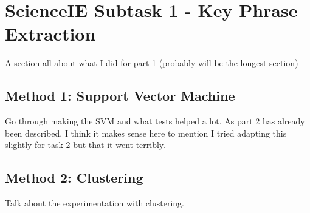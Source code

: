 \section{ScienceIE Subtask 1 - Key Phrase Extraction}
A section all about what I did for part 1 (probably will be the longest section)
\subsection{Method 1: Support Vector Machine}
Go through making the SVM and what tests helped a lot. 
As part 2 has already been described, I think it makes sense here to mention I tried adapting this slightly for task 2 but that it went terribly.
\subsection{Method 2: Clustering}
Talk about the experimentation with clustering.
